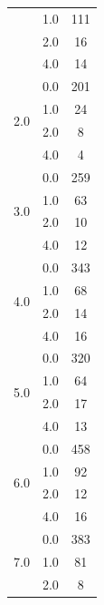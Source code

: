 \begin{longtable}{|c|c|c|c|c|}
& \multicolumn{2}{c|}{1.0} & \multicolumn{2}{c|}{111} \\
& \multicolumn{2}{c|}{2.0} & \multicolumn{2}{c|}{16} \\
& \multicolumn{2}{c|}{4.0} & \multicolumn{2}{c|}{14} \\
\hline
\multirow{4}{*}{2.0} & \multicolumn{2}{c|}{0.0} & \multicolumn{2}{c|}{201} \\
& \multicolumn{2}{c|}{1.0} & \multicolumn{2}{c|}{24} \\
& \multicolumn{2}{c|}{2.0} & \multicolumn{2}{c|}{8} \\
& \multicolumn{2}{c|}{4.0} & \multicolumn{2}{c|}{4} \\
\hline
\multirow{4}{*}{3.0} & \multicolumn{2}{c|}{0.0} & \multicolumn{2}{c|}{259} \\
& \multicolumn{2}{c|}{1.0} & \multicolumn{2}{c|}{63} \\
& \multicolumn{2}{c|}{2.0} & \multicolumn{2}{c|}{10} \\
& \multicolumn{2}{c|}{4.0} & \multicolumn{2}{c|}{12} \\
\hline
\multirow{4}{*}{4.0} & \multicolumn{2}{c|}{0.0} & \multicolumn{2}{c|}{343} \\
& \multicolumn{2}{c|}{1.0} & \multicolumn{2}{c|}{68} \\
& \multicolumn{2}{c|}{2.0} & \multicolumn{2}{c|}{14} \\
& \multicolumn{2}{c|}{4.0} & \multicolumn{2}{c|}{16} \\
\hline
\multirow{4}{*}{5.0} & \multicolumn{2}{c|}{0.0} & \multicolumn{2}{c|}{320} \\
& \multicolumn{2}{c|}{1.0} & \multicolumn{2}{c|}{64} \\
& \multicolumn{2}{c|}{2.0} & \multicolumn{2}{c|}{17} \\
& \multicolumn{2}{c|}{4.0} & \multicolumn{2}{c|}{13} \\
\hline
\multirow{4}{*}{6.0} & \multicolumn{2}{c|}{0.0} & \multicolumn{2}{c|}{458} \\
& \multicolumn{2}{c|}{1.0} & \multicolumn{2}{c|}{92} \\
& \multicolumn{2}{c|}{2.0} & \multicolumn{2}{c|}{12} \\
& \multicolumn{2}{c|}{4.0} & \multicolumn{2}{c|}{16} \\
\hline
\multirow{4}{*}{7.0} & \multicolumn{2}{c|}{0.0} & \multicolumn{2}{c|}{383} \\
& \multicolumn{2}{c|}{1.0} & \multicolumn{2}{c|}{81} \\
& \multicolumn{2}{c|}{2.0} & \multicolumn{2}{c|}{8} \\

\end{longtable}
